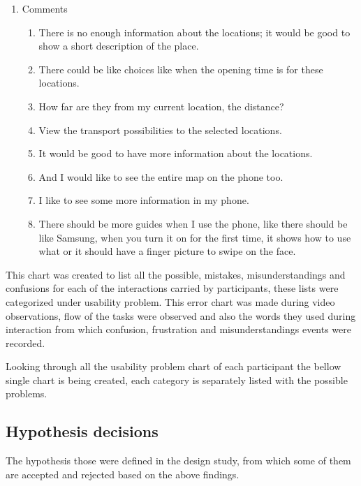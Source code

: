 \begin{enumerate}
\item Comments
\begin{enumerate}
\item  There is no enough information about the locations; it would be good to show a short description of the place.
\item  There could be like choices like when the opening time is for these locations.
\item  How far are they from my current location, the distance?
\item  View the transport possibilities to the selected locations.
\item  It would be good to have more information about the locations.
\item  And I would like to see the entire map on the phone too.
\item  I like to see some more information in my phone.
\item  There should be more guides when I use the phone, like there should be like Samsung, when you turn it on for the first time, it shows how to use what or it should have a finger picture to swipe on the face.
\end{enumerate}

\end{enumerate}

This chart was created to list all the possible, mistakes, misunderstandings and confusions for each of the interactions carried by participants, these lists were categorized under usability problem. This error chart was made during video observations, flow of the tasks were observed and also the words they used during interaction from which confusion, frustration and misunderstandings events were recorded. 

Looking through all the usability problem chart of each participant the bellow single chart is being created, each category is separately listed with the possible problems.


\subsection{Hypothesis decisions}

The hypothesis those were defined in the design study, from which some of them are accepted and rejected based on the above findings. 

